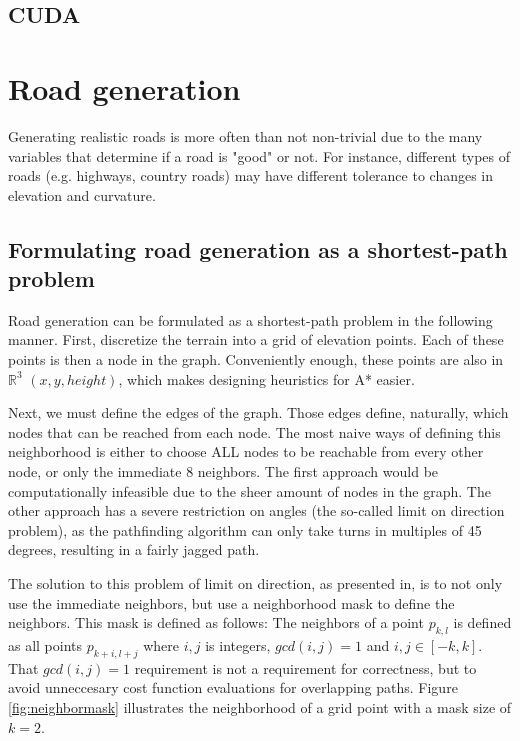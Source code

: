 \subsection{CUDA}

\section{Road generation}
Generating realistic roads is more often than not non-trivial due to the many variables that determine if a road is "good" or not. For instance, different types of roads (e.g. highways, country roads) may have different tolerance to changes in elevation and curvature. 

\subsection{Formulating road generation as a shortest-path problem}
Road generation can be formulated as a shortest-path problem in the following manner. First, discretize the terrain into a grid of elevation points. Each of these points is then a node in the graph. Conveniently enough, these points are also in $\mathbb{R}^3$ $(x,y,height)$, which makes designing heuristics for A* easier.

Next, we must define the edges of the graph. Those edges define, naturally, which nodes that can be reached from each node. The most naive ways of defining this neighborhood is either to choose ALL nodes to be reachable from every other node, or only the immediate 8 neighbors. The first approach would be computationally infeasible due to the sheer amount of nodes in the graph. The other approach has a severe restriction on angles (the so-called limit on direction problem\cite{roadgen}), as the pathfinding algorithm can only take turns in multiples of 45 degrees, resulting in a fairly jagged path. 

The solution to this problem of limit on direction, as presented in\cite{roadgen}, is to not only use the immediate neighbors, but use a neighborhood mask to define the neighbors. This mask is defined as follows: The neighbors of a point $p_{k,l}$ is defined as all points $p_{k+i,l+j}$ where $i,j$ is integers, $gcd(i,j) = 1$ and $i,j \in [-k,k]$. That $gcd(i,j)=1$ requirement is not a requirement for correctness, but to avoid unneccesary cost function evaluations for overlapping paths. Figure \ref{fig:neighbormask} illustrates the neighborhood of a grid point with a mask size of $k=2$.

